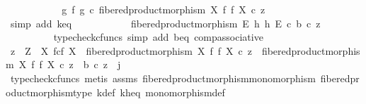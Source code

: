 \begin{isabellebody}
\ \ \ \ \ \ \isamarkupfalse%
\ \isamarkupfalse%
\ {\isachardoublequoteopen}{\isachardot}{\kern0pt}{\isachardot}{\kern0pt}{\isachardot}{\kern0pt}\ {\isacharequal}{\kern0pt}\ {\isacharparenleft}{\kern0pt}g\ {\isasymtimes}\isactrlsub f\ g{\isacharparenright}{\kern0pt}\ {\isasymcirc}\isactrlsub c\ fibered{\isacharunderscore}{\kern0pt}product{\isacharunderscore}{\kern0pt}morphism\ X\ f\ f\ X\ {\isasymcirc}\isactrlsub c\ z{\isachardoublequoteclose}\isanewline
\ \ \ \ \ \ \ \ \isamarkupfalse%
\ {\isacharparenleft}{\kern0pt}simp\ add{\isacharcolon}{\kern0pt}\ k{\isacharunderscore}{\kern0pt}eq{\isacharparenright}{\kern0pt}\isanewline
\ \ \ \ \ \ \isamarkupfalse%
\ \isamarkupfalse%
\ {\isachardoublequoteopen}{\isachardot}{\kern0pt}{\isachardot}{\kern0pt}{\isachardot}{\kern0pt}\ {\isacharequal}{\kern0pt}\ fibered{\isacharunderscore}{\kern0pt}product{\isacharunderscore}{\kern0pt}morphism\ E\ h\ h\ E\ {\isasymcirc}\isactrlsub c\ b\ {\isasymcirc}\isactrlsub c\ z{\isachardoublequoteclose}\isanewline
\ \ \ \ \ \ \ \ \isamarkupfalse%
\ {\isacharparenleft}{\kern0pt}typecheck{\isacharunderscore}{\kern0pt}cfuncs{\isacharcomma}{\kern0pt}\ simp\ add{\isacharcolon}{\kern0pt}\ b{\isacharunderscore}{\kern0pt}eq\ comp{\isacharunderscore}{\kern0pt}associative{}{\isacharparenright}{\kern0pt}\isanewline
\ \ \ \ \ \ \isamarkupfalse%
\ \isamarkupfalse%
\ {\isachardoublequoteopen}z\ {\isacharcolon}{\kern0pt}\ Z\ {\isasymrightarrow}\ X\ \isactrlbsub f\isactrlesub {\isasymtimes}\isactrlsub c\isactrlbsub f\isactrlesub \ X\ {\isasymand}\ fibered{\isacharunderscore}{\kern0pt}product{\isacharunderscore}{\kern0pt}morphism\ X\ f\ f\ X\ {\isasymcirc}\isactrlsub c\ z\ {\isacharequal}{\kern0pt}\ fibered{\isacharunderscore}{\kern0pt}product{\isacharunderscore}{\kern0pt}morphism\ X\ f\ f\ X\ {\isasymcirc}\isactrlsub c\ z\ {\isasymand}\ b\ {\isasymcirc}\isactrlsub c\ z\ {\isacharequal}{\kern0pt}\ j{\isachardoublequoteclose}\isanewline
\ \ \ \ \ \ \ \ \isamarkupfalse%
\ {\isacharparenleft}{\kern0pt}typecheck{\isacharunderscore}{\kern0pt}cfuncs{\isacharcomma}{\kern0pt}\ metis\ assms{\isacharparenleft}{\kern0pt}{}{\isacharparenright}{\kern0pt}\ fibered{\isacharunderscore}{\kern0pt}product{\isacharunderscore}{\kern0pt}morphism{\isacharunderscore}{\kern0pt}monomorphism\ fibered{\isacharunderscore}{\kern0pt}product{\isacharunderscore}{\kern0pt}morphism{\isacharunderscore}{\kern0pt}type\ k{\isacharunderscore}{\kern0pt}def\ k{\isacharunderscore}{\kern0pt}h{\isacharunderscore}{\kern0pt}eq\ monomorphism{\isacharunderscore}{\kern0pt}def{}{\isacharparenright}{\kern0pt}\isanewline

\end{isabellebody}
